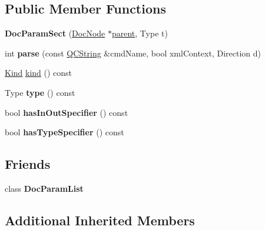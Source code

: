 \subsection*{Public Member Functions}
\begin{DoxyCompactItemize}
\item 
\mbox{\label{class_doc_param_sect_aeb6f093d845b9b44fde36c0fe85d916b}} 
{\bfseries Doc\+Param\+Sect} (\mbox{\hyperlink{class_doc_node}{Doc\+Node}} $\ast$\mbox{\hyperlink{class_doc_node_a73e8ad29a91cfceb0968eb00db71a23d}{parent}}, Type t)
\item 
\mbox{\label{class_doc_param_sect_a626fe5b50a6117fb4d1149ff67ff249d}} 
int {\bfseries parse} (const \mbox{\hyperlink{class_q_c_string}{Q\+C\+String}} \&cmd\+Name, bool xml\+Context, Direction d)
\item 
\mbox{\hyperlink{class_doc_node_aebd16e89ca590d84cbd40543ea5faadb}{Kind}} \mbox{\hyperlink{class_doc_param_sect_aa9373d28ee9c50485a28269fa16db197}{kind}} () const
\item 
\mbox{\label{class_doc_param_sect_afcb0666a1b93ac69a56ab22179827d8a}} 
Type {\bfseries type} () const
\item 
\mbox{\label{class_doc_param_sect_a7ec7b05c44ebac263741f2983cb4f6b3}} 
bool {\bfseries has\+In\+Out\+Specifier} () const
\item 
\mbox{\label{class_doc_param_sect_ae994d0e9cc1d360aaa8d653042c929af}} 
bool {\bfseries has\+Type\+Specifier} () const
\end{DoxyCompactItemize}
\subsection*{Friends}
\begin{DoxyCompactItemize}
\item 
\mbox{\label{class_doc_param_sect_a8d559bee17ecf9f9dc8f39029d78e567}} 
class {\bfseries Doc\+Param\+List}
\end{DoxyCompactItemize}
\subsection*{Additional Inherited Members}


